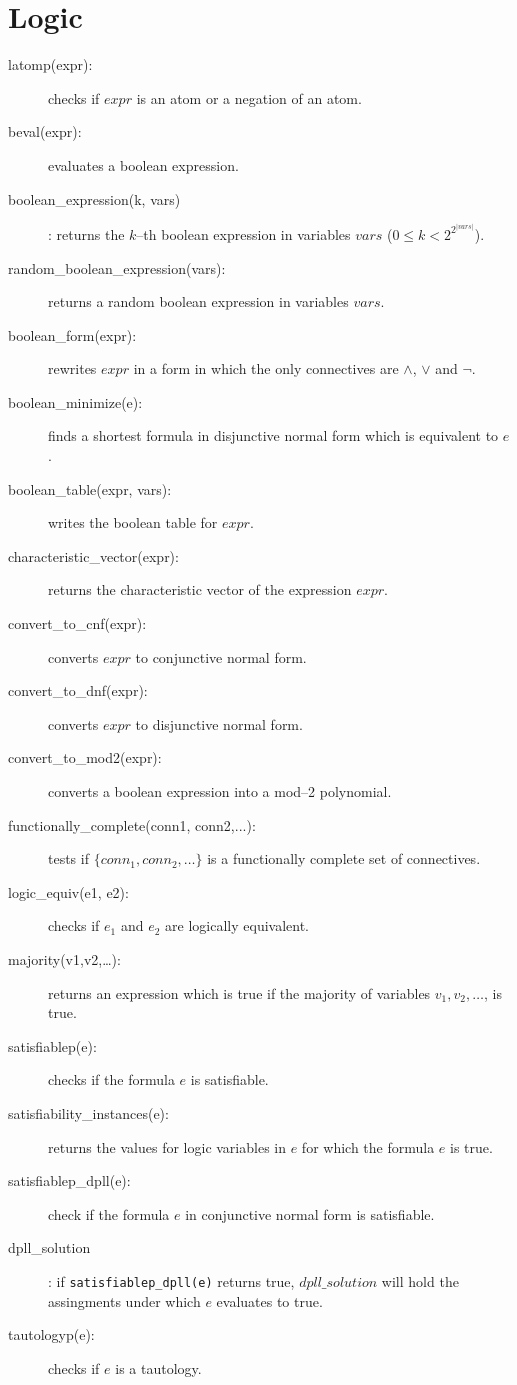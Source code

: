 \documentclass[11pt]{article}
\begin{document}
\section{Logic}
\begin{description}
  \item[latomp(expr):] checks if $expr$ is an atom or a negation of an
    atom.
  \item[beval(expr):] evaluates a boolean expression.
  \item[boolean\_expression(k, vars)]: returns the $k$--th boolean
    expression in variables $vars$ ($0\leq k < 2^{2^{|vars|}}$).
  \item[random\_boolean\_expression(vars):] returns a random boolean
    expression in variables $vars$.
  \item[boolean\_form(expr):] rewrites $expr$ in a form in which the
    only connectives are $\land$, $\lor$ and $\lnot$.
  \item[boolean\_minimize(e):] finds a shortest formula in disjunctive
    normal form which is equivalent to $e$.
  \item[boolean\_table(expr, vars):] writes the boolean table for
    $expr$.
  \item[characteristic\_vector(expr):] returns the characteristic
    vector of the expression $expr$.
  \item[convert\_to\_cnf(expr):] converts $expr$ to conjunctive normal
    form.
  \item[convert\_to\_dnf(expr):] converts $expr$ to disjunctive normal
    form.
  \item[convert\_to\_mod2(expr):] converts a boolean expression into a
    mod--2 polynomial.
  \item[functionally\_complete(conn1, conn2,...):] tests if $\{conn_1,
    conn_2, \ldots\}$ is a functionally complete set of connectives.
  \item[logic\_equiv(e1, e2):] checks if $e_1$ and $e_2$ are logically
    equivalent.
  \item[majority(v1,v2,\ldots):] returns an expression which is true
    if the majority of variables $v_1, v_2, \ldots$, is true.
  \item[satisfiablep(e):] checks if the formula $e$ is satisfiable.
  \item[satisfiability\_instances(e):] returns the values for logic
    variables in $e$ for which the formula $e$ is true.
  \item[satisfiablep\_dpll(e):] check if the formula $e$ in
    conjunctive normal form is satisfiable.
  \item[dpll\_solution]: if \verb|satisfiablep_dpll(e)| returns true,
    $dpll\_solution$ will hold the assingments under which $e$
    evaluates to true.
  \item[tautologyp(e):] checks if $e$ is a tautology.
\end{description}
\end{document}
